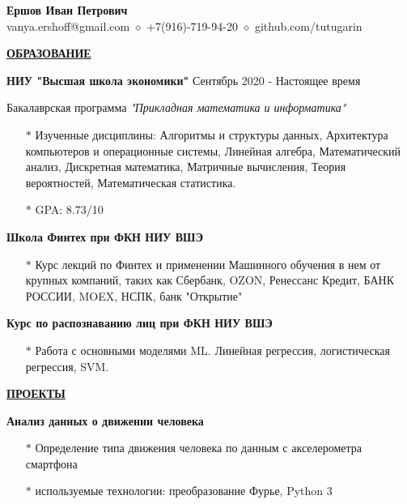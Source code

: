 \documentclass[11pt]{article}
\begin{document}
\begin{center}
\thispagestyle{empty}
\large \textbf{Ершов Иван Петрович \\}    
\normalsize vanya.ershoff@gmail.com $\diamond$ +7(916)-719-94-20 $\diamond$ github.com/tutugarin   \\
\hrulefill
\end{center}

\noindent \textbf{\underline{ОБРАЗОВАНИЕ}} \\
\par \textbf{НИУ "Высшая школа экономики"} \hfill Сентябрь 2020 - Настоящее время
\par Бакалаврская программа \textit{"Прикладная математика и информатика" } 
\begin{itemize}
\item[$\ast$] Изученные дисциплины: Алгоритмы и структуры данных, Архитектура компьютеров и операционные системы, Линейная алгебра, Математический анализ, Дискретная математика, Матричные вычисления, Теория вероятностей, Математическая статистика.

\item[$\ast$] GPA: 8.73/10
\end{itemize}
\par \textbf{Школа Финтех при ФКН НИУ ВШЭ}
\begin{itemize}
\item[$\ast$] Курс лекций по Финтех и применении Машинного обучения в нем от крупных компаний, таких как Сбербанк, OZON, Ренессанс Кредит, БАНК РОССИИ, MOEX, НСПК, банк "Открытие"
\end{itemize}

\par \textbf{Курс по распознаванию лиц при ФКН НИУ ВШЭ}
\begin{itemize}
\item[$\ast$] Работа с основными моделями ML. Линейная регрессия, логистическая регрессия, SVM. 
\end{itemize}

\noindent \textbf{\underline{ПРОЕКТЫ}} \\
\par \textbf{Анализ данных о движении человека}
\begin{itemize}
\item[$\ast$] Определение типа движения человека по данным с акселерометра смартфона
\item[$\ast$] используемые технологии: преобразование Фурье, Python 3
\end{itemize}
\end{document}

